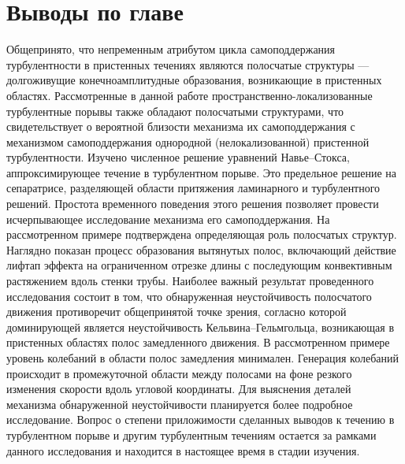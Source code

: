 \section{Выводы по главе}

Общепринято, что непременным атрибутом цикла самоподдержания турбулентности в пристенных течениях являются полосчатые структуры --- долгоживущие конечноамплитудные образования, возникающие в пристенных областях. Рассмотренные в данной работе пространственно-локализованные турбулентные порывы также обладают полосчатыми структурами, что свидетельствует о вероятной близости механизма их самоподдержания с механизмом самоподдержания однородной (нелокализованной) пристенной турбулентности. Изучено численное решение уравнений Навье--Стокса, аппроксимирующее течение в турбулентном порыве. Это предельное решение на сепаратрисе, разделяющей области притяжения ламинарного и турбулентного решений. Простота временного поведения этого решения позволяет провести исчерпывающее исследование механизма его самоподдержания. На рассмотренном примере подтверждена определяющая роль полосчатых структур. Наглядно показан процесс образования вытянутых полос, включающий действие лифтап  эффекта на ограниченном отрезке длины с последующим конвективным растяжением вдоль стенки трубы. Наиболее важный результат проведенного исследования состоит в том, что обнаруженная неустойчивость полосчатого движения противоречит общепринятой точке зрения, согласно которой доминирующей является неустойчивость Кельвина--Гельмгольца, возникающая в пристенных областях полос замедленного движения. В рассмотренном примере уровень колебаний в области полос замедления минимален. Генерация колебаний происходит в промежуточной области между полосами на фоне резкого изменения скорости вдоль угловой координаты. Для выяснения деталей механизма обнаруженной неустойчивости планируется более подробное исследование. Вопрос о степени приложимости сделанных выводов к течению в турбулентном порыве и другим турбулентным течениям остается за рамками данного исследования и находится в настоящее время в стадии изучения.


